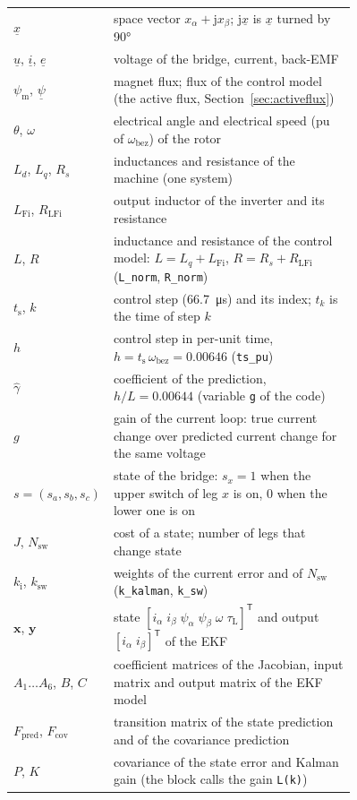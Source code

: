 \documentclass[11pt,a4paper]{scrartcl}
\newcommand{\ped}[1]{_{\mathrm{#1}}}
\newcommand{\code}[1]{\texttt{#1}}
\newcommand{\jj}{\mathrm{j}}
\newcommand{\T}{^{\mathsf{T}}}
\begin{document}
\begin{onehalfspace}
\begin{longtable}{@{} l p{0.76\linewidth} @{}}
	$\underline{x}$ & space vector $x_\alpha + \jj x_\beta$; $\jj\underline{x}$ is $\underline{x}$ turned by \ang{90} \\
	$\underline{u}$, $\underline{i}$, $\underline{e}$ & voltage of the bridge, current, back-EMF \\
	$\psi\ped{m}$, $\underline{\psi}$ & magnet flux; flux of the control model (the active flux, Section~\ref{sec:activeflux}) \\
	$\theta$, $\omega$ & electrical angle and electrical speed (pu of $\omega\ped{bez}$) of the rotor \\
	$L_d$, $L_q$, $R_s$ & inductances and resistance of the machine (one system) \\
	$L\ped{Fi}$, $R\ped{LFi}$ & output inductor of the inverter and its resistance \\
	$L$, $R$ & inductance and resistance of the control model: $L = L_q + L\ped{Fi}$, $R = R_s + R\ped{LFi}$ (\code{L\_norm}, \code{R\_norm}) \\
	$t\ped{s}$, $k$ & control step (\SI{66.7}{\micro\second}) and its index; $t_k$ is the time of step $k$ \\
	$h$ & control step in per-unit time, $h = t\ped{s}\,\omega\ped{bez} = 0.00646$ (\code{ts\_pu}) \\
	$\hat\gamma$ & coefficient of the prediction, $h/L = 0.00644$ (variable \code{g} of the code) \\
	$g$ & gain of the current loop: true current change over predicted current change for the same voltage \\
	$s = (s_a, s_b, s_c)$ & state of the bridge: $s_x = 1$ when the upper switch of leg $x$ is on, 0 when the lower one is on \\
	$J$, $N\ped{sw}$ & cost of a state; number of legs that change state \\
	$k\ped{i}$, $k\ped{sw}$ & weights of the current error and of $N\ped{sw}$ (\code{k\_kalman}, \code{k\_sw}) \\
	$\bm{x}$, $\bm{y}$ & state $[i_\alpha\; i_\beta\; \psi_\alpha\; \psi_\beta\; \omega\; \tau\ped{L}]\T$ and output $[i_\alpha\; i_\beta]\T$ of the EKF \\
	$A_1 \ldots A_6$, $B$, $C$ & coefficient matrices of the Jacobian, input matrix and output matrix of the EKF model \\
	$F\ped{pred}$, $F\ped{cov}$ & transition matrix of the state prediction and of the covariance prediction \\
	$P$, $K$ & covariance of the state error and Kalman gain (the block calls the gain \code{L(k)}) \\

\end{longtable}
\end{onehalfspace}
\end{document}
